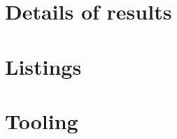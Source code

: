 \documentclass[
  oneside,
  11pt, a4paper,
  footinclude=true,
  headinclude=true,
  cleardoublepage=empty
]{scrbook}
\begin{document}
\chapter{Details of results}

\chapter{Listings}

\chapter{Tooling}

	
\begin{backcover}
\thispagestyle{empty} \pagecolor{white} \textcolor{black} {\selectfont ~\vfill
\noindent
%
\vfill ~}
\end{backcover}
\end{document}
